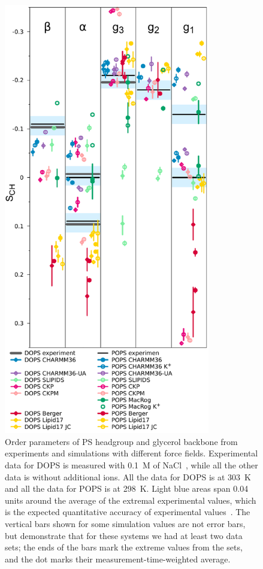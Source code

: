 \documentclass[aps,prl,superscriptaddress,twocolumn]{revtex4}
\begin{document}
\begin{figure}[]
  \centering
  \includegraphics[width=9.0cm]{../Figs/HGorderparametersPS.pdf}
  \caption{\label{HGorderParametersPS}
    Order parameters of PS headgroup and glycerol backbone from experiments
    and simulations with different force fields.
    Experimental data for DOPS is measured with 0.1~M of NaCl~\cite{browning80},
    while all the other data is without additional ions.
    All the data for DOPS is at 303~K and all the data for POPS is at 298~K.
    Light blue areas span 0.04 units around the average of the extremal experimental values,
    which is the expected quantitative accuracy of experimental values~\cite{ollila16}.
    The vertical bars shown for some simulation values
    are not error bars, but demonstrate that for these systems
    we had at least two data sets; the ends of the bars mark the extreme values
    from the sets, and the dot marks their measurement-time-weighted average.
  }
\end{figure}
\end{document}
